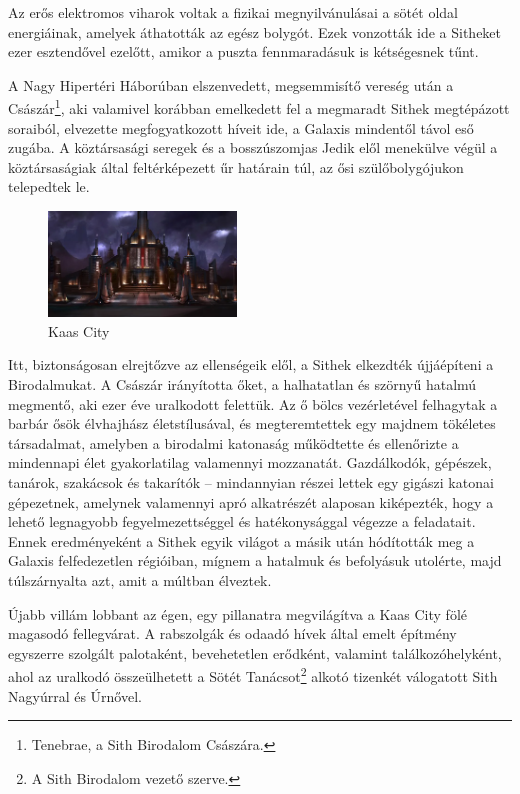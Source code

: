 \documentclass{thesis-ekf}
\theoremstyle{definition}
\begin{document}
Az erős elektromos viharok voltak a fizikai megnyilvánulásai a sötét oldal energiáinak,
amelyek áthatották az egész bolygót. Ezek vonzották ide a Sitheket ezer esztendővel ezelőtt,
amikor a puszta fennmaradásuk is kétségesnek tűnt.

A Nagy Hipertéri Háborúban elszenvedett, megsemmisítő vereség után a Császár\footnote{Tenebrae, a Sith Birodalom Császára.}, aki
valamivel korábban emelkedett fel a megmaradt Sithek megtépázott soraiból, elvezette
megfogyatkozott híveit ide, a Galaxis mindentől távol eső zugába. A köztársasági seregek és a
bosszúszomjas Jedik elől menekülve végül a köztársaságiak által feltérképezett űr határain túl,
az ősi szülőbolygójukon telepedtek le.



\begin{figure}[!ht]
	\centering
	\includegraphics[width=5cm]{kaascity}
	\caption{Kaas City}
	\label{figure-kaascity}
\end{figure}

Itt, biztonságosan elrejtőzve az ellenségeik elől, a Sithek elkezdték újjáépíteni a Birodalmukat.
A Császár irányította őket, a halhatatlan és szörnyű hatalmú megmentő, aki ezer éve uralkodott
felettük. Az ő bölcs vezérletével felhagytak a barbár ősök élvhajhász életstílusával, és
megteremtettek egy majdnem tökéletes társadalmat, amelyben a birodalmi katonaság
működtette és ellenőrizte a mindennapi élet gyakorlatilag valamennyi mozzanatát. Gazdálkodók,
gépészek, tanárok, szakácsok és takarítók -- mindannyian részei lettek egy gigászi katonai
gépezetnek, amelynek valamennyi apró alkatrészét alaposan kiképezték, hogy a lehető
legnagyobb fegyelmezettséggel és hatékonysággal végezze a feladatait. Ennek eredményeként
a Sithek egyik világot a másik után hódították meg a Galaxis felfedezetlen régióiban, mígnem a
hatalmuk és befolyásuk utolérte, majd túlszárnyalta azt, amit a múltban élveztek.

Újabb villám lobbant az égen, egy pillanatra megvilágítva a Kaas City fölé magasodó
fellegvárat. A rabszolgák és odaadó hívek által emelt építmény egyszerre szolgált palotaként,
bevehetetlen erődként, valamint találkozóhelyként, ahol az uralkodó összeülhetett a Sötét
Tanácsot\footnote{A Sith Birodalom vezető szerve.} alkotó tizenkét válogatott Sith Nagyúrral és Úrnővel.
\cite[66.~oldal]{Jeffrey,Paul}
\end{document}

